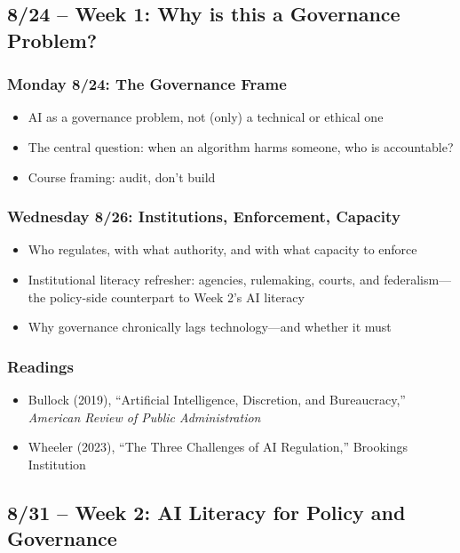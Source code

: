 \documentclass[12pt]{article}
\begin{document}
\subsection*{8/24 -- Week 1: Why is this a Governance Problem?}
    \subsubsection*{Monday 8/24: The Governance Frame}
        \begin{itemize}
            \item AI as a governance problem, not (only) a technical or ethical one
            \item The central question: when an algorithm harms someone, who is accountable?
            \item Course framing: audit, don't build
        \end{itemize}
    \subsubsection*{Wednesday 8/26: Institutions, Enforcement, Capacity}
        \begin{itemize}
            \item Who regulates, with what authority, and with what capacity to enforce
            \item Institutional literacy refresher: agencies, rulemaking, courts, and federalism---the policy-side counterpart to Week 2's AI literacy
            \item Why governance chronically lags technology---and whether it must
        \end{itemize}
    \subsubsection*{Readings}
        \begin{itemize}
            \item Bullock (2019), ``Artificial Intelligence, Discretion, and Bureaucracy,'' \emph{American Review of Public Administration}
            \item Wheeler (2023), ``The Three Challenges of AI Regulation,'' Brookings Institution
        \end{itemize}

\subsection*{8/31 -- Week 2: AI Literacy for Policy and Governance}
\end{document}
